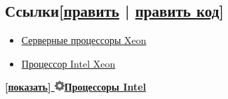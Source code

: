 \documentclass[a4paper,11pt]{article}
\begin{document}
\subsection{Ссылки[\href{https://ru.wikipedia.org/w/index.php?title=Xeon&amp;veaction=edit&amp;section=15}{править} | \href{https://ru.wikipedia.org/w/index.php?title=Xeon&amp;action=edit&amp;section=15}{править код}]}
\begin{itemize}
	\item \href{http://www.intel.com/ru_RU/products/server/processor/}{Серверные процессоры Xeon}
	\item \href{http://www.intel.com/support/ru/processors/xeon/index.htm}{Процессор Intel Xeon}
\end{itemize}
\begin{tabular}\textbf{[\href{javascript:collapseTable(0);}{показать}]\href{https://ru.wikipedia.org/wiki/%D0%A8%D0%B0%D0%B1%D0%BB%D0%BE%D0%BD:%D0%9F%D1%80%D0%BE%D1%86%D0%B5%D1%81%D1%81%D0%BE%D1%80%D1%8B_Intel}{
\includegraphics{xeon_files/14px-Wikipedia_interwiki_section_gear_icon.png}}\href{https://ru.wikipedia.org/wiki/%D0%A1%D0%BF%D0%B8%D1%81%D0%BE%D0%BA_%D0%BC%D0%B8%D0%BA%D1%80%D0%BE%D0%BF%D1%80%D0%BE%D1%86%D0%B5%D1%81%D1%81%D0%BE%D1%80%D0%BE%D0%B2_Intel}{Процессоры Intel}} \\ 


\end{tabular}
\end{document}
